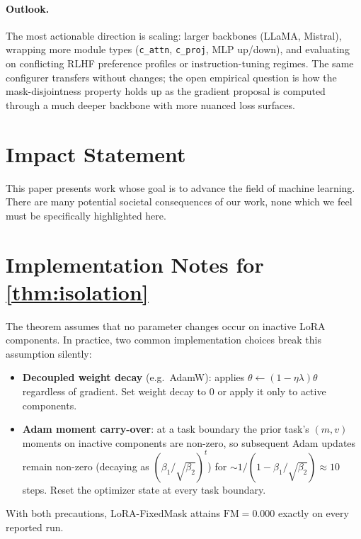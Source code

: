 \documentclass{article}
\theoremstyle{plain}
\theoremstyle{remark}
\begin{document}
\paragraph{Outlook.}
The most actionable direction is scaling: larger backbones (LLaMA, Mistral), wrapping more module types (\texttt{c\_attn}, \texttt{c\_proj}, MLP up/down), and evaluating on conflicting RLHF preference profiles or instruction-tuning regimes. The same configurer transfers without changes; the open empirical question is how the mask-disjointness property holds up as the gradient proposal is computed through a much deeper backbone with more nuanced loss surfaces.

\section*{Impact Statement}

This paper presents work whose goal is to advance the field of machine learning. There are many potential societal consequences of our work, none which we feel must be specifically highlighted here.




\newpage
\appendix
\onecolumn

\section{Implementation Notes for \cref{thm:isolation}}
\label{app:impl}
The theorem assumes that no parameter changes occur on inactive LoRA components. In practice, two common implementation choices break this assumption silently:

\begin{itemize}
\item \textbf{Decoupled weight decay} (e.g.\ AdamW): applies $\theta\leftarrow(1-\eta\lambda)\theta$ regardless of gradient. Set weight decay to $0$ or apply it only to active components.
\item \textbf{Adam moment carry-over}: at a task boundary the prior task's $(m,v)$ moments on inactive components are non-zero, so subsequent Adam updates remain non-zero (decaying as $(\beta_1/\sqrt{\beta_2})^t$) for $\sim 1/(1-\beta_1/\sqrt{\beta_2})\approx 10$ steps. Reset the optimizer state at every task boundary.
\end{itemize}
With both precautions, LoRA-FixedMask attains $\mathrm{FM}=0.000$ exactly on every reported run.
\end{document}
